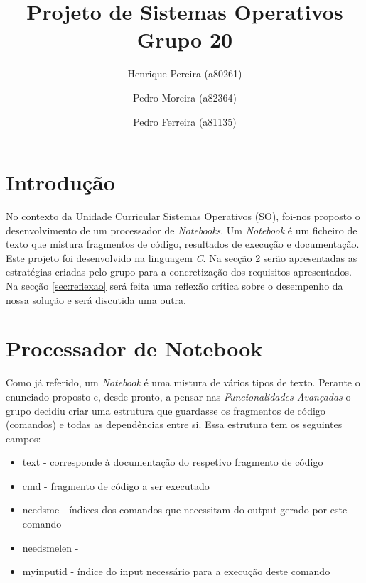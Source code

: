 \documentclass[a4paper]{article}
\title{Projeto de Sistemas Operativos\\Grupo 20}
\author{Henrique Pereira (a80261) \and Pedro Moreira (a82364) \and Pedro Ferreira (a81135) }
\begin{document}
\maketitle

\newpage

\tableofcontents

\newpage

\section{Introdução}
\label{sec:intro}

No contexto da Unidade Curricular Sistemas Operativos (SO), foi-nos proposto o desenvolvimento de um processador de \textit{Notebooks}. 
Um \textit{Notebook} é um ficheiro de texto que mistura fragmentos de código, resultados de execução e documentação. 
Este projeto foi desenvolvido na linguagem \textit{C}.
Na secção \ref{sec:note} serão apresentadas as estratégias criadas pelo grupo para a concretização dos requisitos apresentados.
Na secção \ref{sec:reflexao} será feita uma reflexão crítica sobre o desempenho da nossa solução e será discutida uma outra.


\section{Processador de Notebook}
\label{sec:note}

Como já referido, um \textit{Notebook} é uma mistura de vários tipos de texto. Perante o enunciado proposto e, desde pronto, a pensar nas 
\textit{Funcionalidades Avançadas} o grupo decidiu criar uma estrutura que guardasse os fragmentos de código (comandos) e todas as dependências entre si.
Essa estrutura tem os seguintes campos: 


\begin{itemize}
  \item{text - corresponde à documentação do respetivo fragmento de código}
  \item{cmd - fragmento de código a ser executado}
  \item{needsme - índices dos comandos que necessitam do output gerado por este comando} %
  \item{needsmelen - } %
  \item{myinputid - índice do input necessário para a execução deste comando}
\end{itemize}
\end{document}
